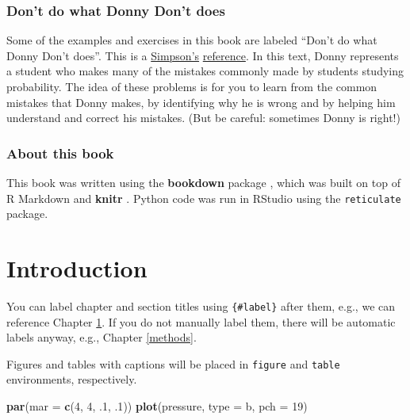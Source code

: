 \documentclass[
]{book}
\newenvironment{Shaded}{\begin{snugshade}}{\end{snugshade}}
\newcommand{\DataTypeTok}[1]{\textcolor[rgb]{0.13,0.29,0.53}{#1}}
\newcommand{\DecValTok}[1]{\textcolor[rgb]{0.00,0.00,0.81}{#1}}
\newcommand{\FloatTok}[1]{\textcolor[rgb]{0.00,0.00,0.81}{#1}}
\newcommand{\KeywordTok}[1]{\textcolor[rgb]{0.13,0.29,0.53}{\textbf{#1}}}
\newcommand{\NormalTok}[1]{#1}
\newcommand{\StringTok}[1]{\textcolor[rgb]{0.31,0.60,0.02}{#1}}
\theoremstyle{definition}
\theoremstyle{definition}
\theoremstyle{definition}
\theoremstyle{remark}
\begin{document}
\hypertarget{dont-do-what-donny-dont-does}{%
\subsection*{Don't do what Donny Don't does}\label{dont-do-what-donny-dont-does}}

Some of the examples and exercises in this book are labeled ``Don't do what Donny Don't does''. This is a \href{https://frinkiac.com/video/S05E08/0nvMY69o6o_U7BqeIzQ314al-SQ=.gif}{Simpson's} \href{https://www.youtube.com/watch?v=pbwxlyUunL8}{reference}. In this text, Donny represents a student who makes many of the mistakes commonly made by students studying probability. The idea of these problems is for you to learn from the common mistakes that Donny makes, by identifying why he is wrong and by helping him understand and correct his mistakes. (But be careful: sometimes Donny is right!)

\hypertarget{about-this-book}{%
\subsection*{About this book}\label{about-this-book}}

This book was written using the \textbf{bookdown} package \citep{R-bookdown}, which was built on top of R Markdown and \textbf{knitr} \citep{xie2015}. Python code was run in RStudio using the \texttt{reticulate} package.

\hypertarget{intro}{%
\chapter{Introduction}\label{intro}}

You can label chapter and section titles using \texttt{\{\#label\}} after them, e.g., we can reference Chapter \ref{intro}. If you do not manually label them, there will be automatic labels anyway, e.g., Chapter \ref{methods}.

Figures and tables with captions will be placed in \texttt{figure} and \texttt{table} environments, respectively.

\begin{Shaded}
\begin{Highlighting}[]
\KeywordTok{par}\NormalTok{(}\DataTypeTok{mar =} \KeywordTok{c}\NormalTok{(}\DecValTok{4}\NormalTok{, }\DecValTok{4}\NormalTok{, }\FloatTok{.1}\NormalTok{, }\FloatTok{.1}\NormalTok{))}
\KeywordTok{plot}\NormalTok{(pressure, }\DataTypeTok{type =} \StringTok{\textquotesingle{}b\textquotesingle{}}\NormalTok{, }\DataTypeTok{pch =} \DecValTok{19}\NormalTok{)}
\end{Highlighting}
\end{Shaded}
\end{document}
